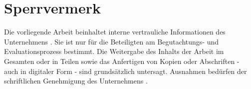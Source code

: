 \chapter*{Sperrvermerk}

\begin{center}
\end{center}

Die vorliegende Arbeit beinhaltet interne vertrauliche Informationen des Unternehmens \TheCompany.
Sie ist nur für die Beteiligten am Begutachtungs- und Evaluationsprozess bestimmt.
Die Weitergabe des Inhalts der Arbeit im Gesamten oder in Teilen sowie das Anfertigen von
Kopien oder Abschriften - auch in digitaler Form - sind grundsätzlich untersagt.
Ausnahmen bedürfen der schriftlichen Genehmigung des Unternehmens \TheCompany.